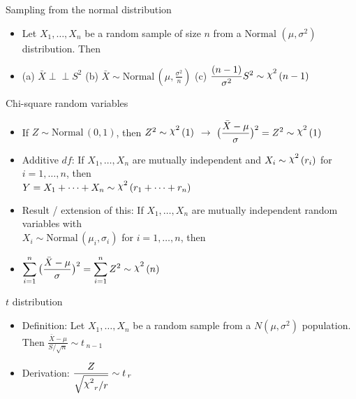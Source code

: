 \documentclass{article}
\newcommand{\ind}{\perp \!\!\! \perp}			%
\newcommand{\follow}[1]{\sim \text{#1}\,}		%
\newcommand{\vecn}[2]{#1_1, \ldots, #1_{#2}}	%
\newcommand{\chisq}{\raisebox{2pt}{$\chi^2$}}		%
\begin{document}
Sampling from the normal distribution
\begin{itemize}
    \item Let $\vecn{X}{n}$ be a random sample of size $n$ from a $\text{Normal }(\mu, \sigma^2)$ distribution. Then
    \item[] (a) $\bar{X} \ind S^2$ \hspace{20pt} (b) $\bar{X} \follow{Normal}(\mu, \frac{\sigma^2}{n})$ \hspace{20pt} (c) $\displaystyle \frac{(n-1)}{\sigma^2} S^2  \follow{\chisq}(n-1)$
\end{itemize}\bigskip

Chi-square random variables
\begin{itemize}
    \item If $Z \follow{Normal}(0, 1)$, then $Z^2 \follow{\chisq}(1)$ $\rightarrow$ $\displaystyle \big(\frac{\bar{X} - \mu}{\sigma}\big)^2 = Z^2 \follow{\chisq}(1)$
    \item Additive $df$: If $\vecn{X}{n}$ are mutually independent and $X_i \follow{\chisq}(r_i)$ for $i = 1, \ldots, n$, then \\ $Y = X_1 + \cdots + X_n \follow{\chisq}(r_1 + \cdots + r_n)$
    \item Result / extension of this: If $\vecn{X}{n}$ are mutually independent random variables with \\ $X_i \follow{Normal}(\mu_i, \sigma_i)$ for $i = 1, \ldots, n$, then
    \item[] $\displaystyle \sum_{i=1}^n \big(\frac{\bar{X} - \mu}{\sigma}\big)^2 = \sum_{i=1}^n Z^2 \follow{\chisq}(n)$
\end{itemize}\bigskip

\newpage

$t$ distribution
\begin{itemize}
    \item Definition: Let $\vecn{X}{n}$ be a random sample from a $N(\mu, \sigma^2)$ population. Then $\displaystyle \frac{\bar{X} - \mu}{S / \sqrt{n}} \follow{$t$}_{n-1}$
    \item Derivation: $\displaystyle \frac{Z}{\sqrt{\chisq_r / r}} \follow{$t$}_r$
\end{itemize}\bigskip
\end{document}
